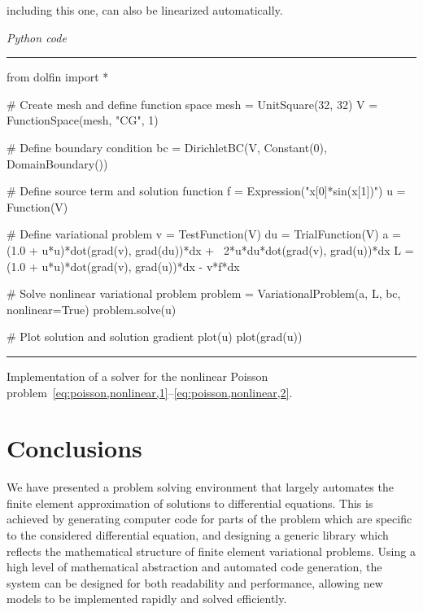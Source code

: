 \documentclass[acmtoms]{acmtrans2m}
\newenvironment{pythoncode}[1]{\center\minipage{#1\textwidth}\footnotesize\hfill\it Python code \rm\vspace{0.1cm}\hrule\renewcommand{\baselinestretch}{0.9}\footnotesize\verbatim}{\endverbatim\hrule\normalsize\endminipage\newline\endcenter}
\begin{document}
including this one, can also be linearized automatically.
\begin{table}
\begin{pythoncode}{0.9}
from dolfin import *

# Create mesh and define function space
mesh = UnitSquare(32, 32)
V = FunctionSpace(mesh, "CG", 1)

# Define boundary condition
bc = DirichletBC(V, Constant(0), DomainBoundary())

# Define source term and solution function
f = Expression("x[0]*sin(x[1])")
u = Function(V)

# Define variational problem
v  = TestFunction(V)
du = TrialFunction(V)
a  = (1.0 + u*u)*dot(grad(v), grad(du))*dx + \
     2*u*du*dot(grad(v), grad(u))*dx
L  = (1.0 + u*u)*dot(grad(v), grad(u))*dx - v*f*dx

# Solve nonlinear variational problem
problem = VariationalProblem(a, L, bc, nonlinear=True)
problem.solve(u)

# Plot solution and solution gradient
plot(u)
plot(grad(u))
\end{pythoncode}
\caption{Implementation of a solver for the nonlinear Poisson
  problem~\eqref{eq:poisson,nonlinear,1}--\eqref{eq:poisson,nonlinear,2}.}
\label{code:poisson,nonlinear}
\end{table}
\section{Conclusions}
\label{sec:conclusions}
We have presented a problem solving environment that largely automates
the finite element approximation of solutions to differential
equations. This is achieved by generating computer code for parts of
the problem which are specific to the considered differential
equation, and designing a generic library which reflects the
mathematical structure of finite element variational problems. Using a
high level of mathematical abstraction and automated code generation,
the system can be designed for both readability and performance,
allowing new models to be implemented rapidly and solved efficiently.
\end{document}
